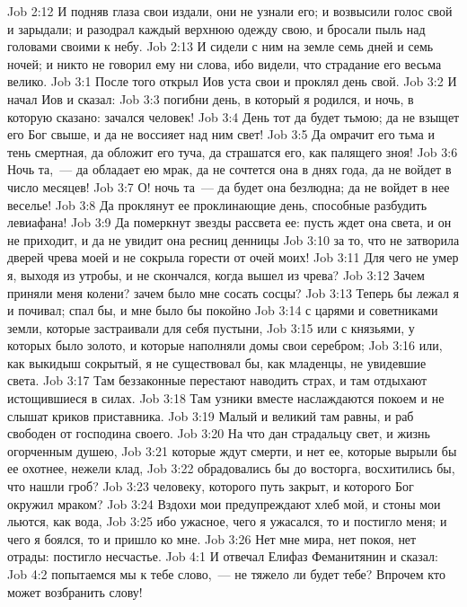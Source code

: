 \vs Job 2:12 И подняв глаза свои издали, они не узнали его; и возвысили голос свой и зарыдали; и разодрал каждый верхнюю одежду свою, и бросали пыль над головами своими к небу.
\vs Job 2:13 И сидели с ним на земле семь дней и семь ночей; и никто не говорил ему ни слова, ибо видели, что страдание его весьма велико.
\vs Job 3:1 После того открыл Иов уста свои и проклял день свой.
\vs Job 3:2 И начал Иов и сказал:
\vs Job 3:3 погибни день, в который я родился, и ночь, в которую сказано: зачался человек!
\vs Job 3:4 День тот да будет тьмою; да не взыщет его Бог свыше, и да не воссияет над ним свет!
\vs Job 3:5 Да омрачит его тьма и тень смертная, да обложит его туча, да страшатся его, как палящего зноя!
\vs Job 3:6 Ночь та,~--- да обладает ею мрак, да не сочтется она в днях года, да не войдет в число месяцев!
\vs Job 3:7 О! ночь та~--- да будет она безлюдна; да не войдет в нее веселье!
\vs Job 3:8 Да проклянут ее проклинающие день, способные разбудить левиафана!
\vs Job 3:9 Да померкнут звезды рассвета ее: пусть ждет она света, и он не приходит, и да не увидит она ресниц денницы
\vs Job 3:10 за то, что не затворила дверей чрева  моей и не сокрыла горести от очей моих!
\vs Job 3:11 Для чего не умер я, выходя из утробы, и не скончался, когда вышел из чрева?
\vs Job 3:12 Зачем приняли меня колени? зачем было мне сосать сосцы?
\vs Job 3:13 Теперь бы лежал я и почивал; спал бы, и мне было бы покойно
\vs Job 3:14 с царями и советниками земли, которые застраивали для себя пустыни,
\vs Job 3:15 или с князьями, у которых было золото, и которые наполняли домы свои серебром;
\vs Job 3:16 или, как выкидыш сокрытый, я не существовал бы, как младенцы, не увидевшие света.
\vs Job 3:17 Там беззаконные перестают наводить страх, и там отдыхают истощившиеся в силах.
\vs Job 3:18 Там узники вместе наслаждаются покоем и не слышат криков приставника.
\vs Job 3:19 Малый и великий там равны, и раб свободен от господина своего.
\vs Job 3:20 На что дан страдальцу свет, и жизнь огорченным душею,
\vs Job 3:21 которые ждут смерти, и нет ее, которые вырыли бы ее охотнее, нежели клад,
\vs Job 3:22 обрадовались бы до восторга, восхитились бы, что нашли гроб?
\vs Job 3:23  человеку, которого путь закрыт, и которого Бог окружил мраком?
\vs Job 3:24 Вздохи мои предупреждают хлеб мой, и стоны мои льются, как вода,
\vs Job 3:25 ибо ужасное, чего я ужасался, то и постигло меня; и чего я боялся, то и пришло ко мне.
\vs Job 3:26 Нет мне мира, нет покоя, нет отрады: постигло несчастье.
\vs Job 4:1 И отвечал Елифаз Феманитянин и сказал:
\vs Job 4:2  попытаемся мы  к тебе слово,~--- не тяжело ли будет тебе? Впрочем кто может возбранить слову!
